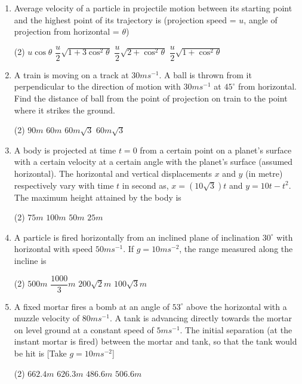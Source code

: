 \documentclass{article}
\renewcommand{\frac}[2]{\dfrac{#1}{#2}}
\begin{document}
\begin{enumerate}
    \item Average velocity of a particle in projectile motion between its starting point and the highest point of its trajectory is (projection speed = \(u\), angle of projection from horizontal = \(\theta\))
    \begin{tasks}(2)
        \task \(u \cos{\theta}\)
        \task \(\frac{u}{2} \sqrt{1 + 3 \cos^2{\theta}}\)
        \task \(\frac{u}{2} \sqrt{2 + \cos^2{\theta}}\)
        \task \(\frac{u}{2} \sqrt{1 + \cos^2{\theta}}\)
    \end{tasks}

    \item A train is moving on a track at \(30 ms^{-1}\). A ball is thrown from it perpendicular to the direction of motion with \(30 ms^{-1}\) at \(45^{\circ}\) from horizontal. Find the distance of ball from the point of projection on train to the point where it strikes the ground.
    \begin{tasks}(2)
        \task \(90 m\)
        \task \(60 m\)
        \task \(60 m \sqrt{3}\)
        \task \(60 m \sqrt{3}\)
    \end{tasks}

    \item A body is projected at time \(t = 0\) from a certain point on a planet's surface with a certain velocity at a certain angle with the planet's surface (assumed horizontal). The horizontal and vertical displacements \(x\) and \(y\) (in metre) respectively vary with time \(t\) in second as, \(x = (10\sqrt{3}) t\) and \(y = 10t - t^{2}\). The maximum height attained by the body is
    \begin{tasks}(2)
        \task \(75 m\)
        \task \(100 m\)
        \task \(50 m\)
        \task \(25 m\)
    \end{tasks}

    \item A particle is fired horizontally from an inclined plane of inclination \(30^{\circ}\) with horizontal with speed \(50 ms^{-1}\). If \(g = 10 ms^{-2}\), the range measured along the incline is
    \begin{tasks}(2)
        \task \(500 m\)
        \task \(\frac{1000}{3} m\)
        \task \(200\sqrt{2} m\)
        \task \(100\sqrt{3} m\)
    \end{tasks}

    \item A fixed mortar fires a bomb at an angle of \(53^{\circ}\) above the horizontal with a muzzle velocity of \(80 ms^{-1}\). A tank is advancing directly towards the mortar on level ground at a constant speed of \(5 ms^{-1}\). The initial separation (at the instant mortar is fired) between the mortar and tank, so that the tank would be hit is [Take \(g = 10 ms^{-2}\)]
    \begin{tasks}(2)
        \task \(662.4 m\)
        \task \(626.3 m\)
        \task \(486.6 m\)
        \task \(506.6 m\)
    \end{tasks}
\end{enumerate}
\end{document}
